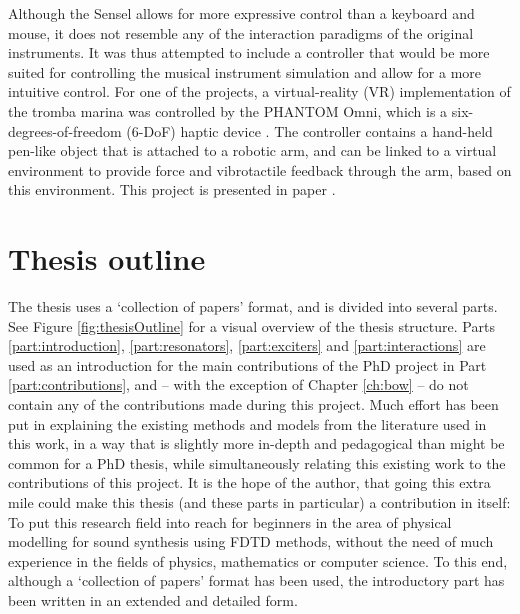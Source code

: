 Although the Sensel allows for more expressive control than a keyboard and mouse, it does not resemble any of the interaction paradigms of the original instruments. It was thus attempted to include a controller that would be more suited for controlling the musical instrument simulation and allow for a more intuitive control.
For one of the projects, a virtual-reality (VR) implementation of the tromba marina was controlled by the PHANTOM Omni, which is a six-degrees-of-freedom (6-DoF) haptic device \cite{phantom}. The controller contains a hand-held pen-like object that is attached to a robotic arm, and can be linked to a virtual environment to provide force and vibrotactile feedback through the arm, based on this environment. This project is presented in paper \citeP[E].

\section{Thesis outline}
The thesis uses a `collection of papers' format, and is divided into several parts. See Figure \ref{fig:thesisOutline} for a visual overview of the thesis structure. Parts \ref{part:introduction}, \ref{part:resonators}, \ref{part:exciters} and \ref{part:interactions} are used as an introduction for the main contributions of the PhD project in Part \ref{part:contributions}, and -- with the exception of Chapter \ref{ch:bow} -- do not contain any of the contributions made during this project. Much effort has been put in explaining the existing methods and models from the literature used in this work, in a way that is slightly more in-depth and pedagogical than might be common for a PhD thesis, while simultaneously relating this existing work to the contributions of this project. It is the hope of the author, that going this extra mile could make this thesis (and these parts in particular) a contribution in itself: To put this research field into reach for beginners in the area of physical modelling for sound synthesis using FDTD methods, without the need of much experience in the fields of physics, mathematics or computer science. To this end, although a `collection of papers' format has been used, the introductory part has been written in an extended and detailed form.

